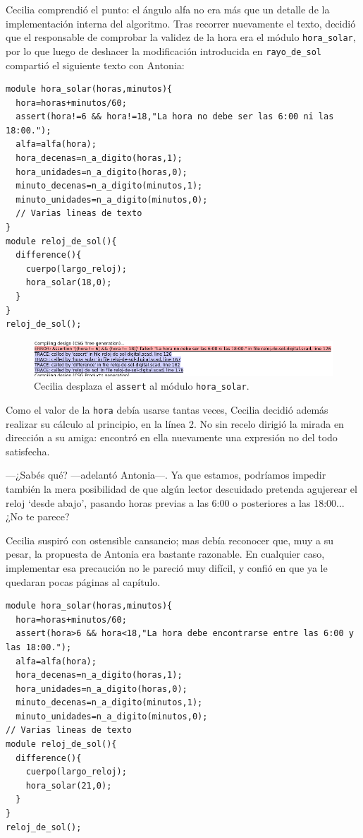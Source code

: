 Cecilia comprendió el punto: el ángulo alfa no era más que un detalle
de la implementación interna del algoritmo. Tras recorrer nuevamente
el texto, decidió que el responsable de comprobar la validez de la
hora era el módulo \lstinline!hora_solar!, por lo que luego de
deshacer la modificación introducida en \lstinline!rayo_de_sol!
compartió el siguiente texto con Antonia:

\begin{lstlisting}
module hora_solar(horas,minutos){
  hora=horas+minutos/60;
  assert(hora!=6 && hora!=18,"La hora no debe ser las 6:00 ni las 18:00.");
  alfa=alfa(hora);
  hora_decenas=n_a_digito(horas,1);
  hora_unidades=n_a_digito(horas,0);
  minuto_decenas=n_a_digito(minutos,1);
  minuto_unidades=n_a_digito(minutos,0);
  // Varias lineas de texto
}
module reloj_de_sol(){
  difference(){
    cuerpo(largo_reloj);
    hora_solar(18,0);
  }
}
reloj_de_sol();
\end{lstlisting}%


\begin{figure}[ht]
  \centering \includegraphics[width=1\textwidth]{imagenes/assert-3}
  \caption{Cecilia desplaza el \texttt{assert} al módulo
    \lstinline!hora_solar!.}
  \label{fig:assert-3}
\end{figure}



Como el valor de la \lstinline!hora! debía usarse tantas veces,
Cecilia decidió además realizar su cálculo al principio, en la línea
2. No sin recelo dirigió la mirada en dirección a su amiga: encontró
en ella nuevamente una expresión no del todo satisfecha.

---¿Sabés qué? ---adelantó Antonia---. Ya que estamos, podríamos
impedir también la mera posibilidad de que algún lector descuidado
pretenda agujerear el reloj `desde abajo', pasando horas previas a las
6:00 o posteriores a las 18:00... ¿No te parece?

Cecilia suspiró con ostensible cansancio; mas debía reconocer que, muy
a su pesar, la propuesta de Antonia era bastante razonable. En
cualquier caso, implementar esa precaución no le pareció muy difícil,
y confió en que ya le quedaran pocas páginas al capítulo.

\begin{lstlisting}
module hora_solar(horas,minutos){
  hora=horas+minutos/60;
  assert(hora>6 && hora<18,"La hora debe encontrarse entre las 6:00 y las 18:00.");
  alfa=alfa(hora);
  hora_decenas=n_a_digito(horas,1);
  hora_unidades=n_a_digito(horas,0);
  minuto_decenas=n_a_digito(minutos,1);
  minuto_unidades=n_a_digito(minutos,0);
// Varias lineas de texto
module reloj_de_sol(){
  difference(){
    cuerpo(largo_reloj);
    hora_solar(21,0);
  }
}
reloj_de_sol();
\end{lstlisting}%


